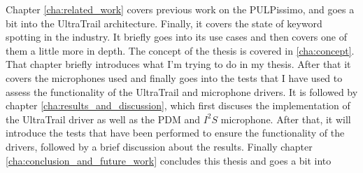 Chapter \ref{cha:related_work} covers previous work on the PULPissimo, and goes a bit into the UltraTrail architecture.
Finally, it covers the state of keyword spotting in the industry.
It briefly goes into its use cases and then covers one of them a little more in depth.
The concept of the thesis is covered in \ref{cha:concept}.
That chapter briefly introduces what I'm trying to do in my thesis.
After that it covers the microphones used and finally goes into the tests that I have used
to assess the functionality of the UltraTrail and microphone drivers.
It is followed by chapter \ref{cha:results_and_discussion}, which first discuses the implementation
of the UltraTrail driver as well as the PDM and $I^2S$ microphone.
After that, it will introduce the tests that have been performed to ensure the functionality of the drivers,
followed by a brief discussion about the results.
Finally chapter \ref{cha:conclusion_and_future_work} concludes this thesis and goes a bit into 


